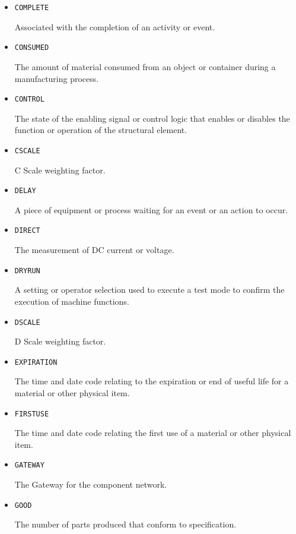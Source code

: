 \begin{itemize}
\item \texttt{COMPLETE}  

Associated with the completion of an activity or event.


\item \texttt{CONSUMED}  

The amount of material consumed from an object or container during a manufacturing process.


\item \texttt{CONTROL}  

The state of the enabling signal or control logic that enables or disables the function or operation of the structural element.


\item \texttt{C\textunderscore SCALE}  

C Scale weighting factor.


\item \texttt{DELAY}  

A piece of equipment or process waiting for an event or an action to occur.


\item \texttt{DIRECT}  

The measurement of DC current or voltage.


\item \texttt{DRY\textunderscore RUN}  

A setting or operator selection used to execute a test mode to confirm the execution of machine functions.


\item \texttt{D\textunderscore SCALE}  

D Scale weighting factor.


\item \texttt{EXPIRATION}  

The time and date code relating to the expiration or end of useful life for a material or other physical item.


\item \texttt{FIRST\textunderscore USE}  

The time and date code relating the first use of a material or other physical item.


\item \texttt{GATEWAY}  

The Gateway for the component network.


\item \texttt{GOOD}  

The number of parts produced that conform to specification.



\end{itemize}

